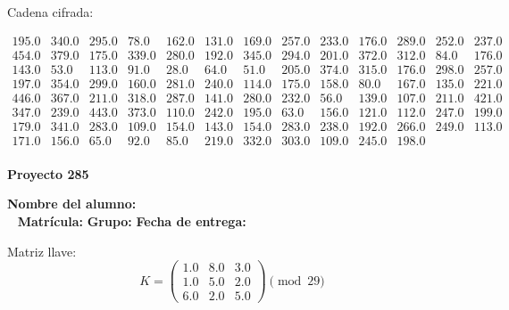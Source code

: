 \documentclass[12pt]{article}
\begin{document}
Cadena cifrada:
\begin{center}
$\begin{array}{lllllllllllll}
195.0 & 340.0 & 295.0 & 78.0 & 162.0 & 131.0 & 169.0 & 257.0 & 233.0 & 176.0 & 289.0 & 252.0 & 237.0\\
454.0 & 379.0 & 175.0 & 339.0 & 280.0 & 192.0 & 345.0 & 294.0 & 201.0 & 372.0 & 312.0 & 84.0 & 176.0\\
143.0 & 53.0 & 113.0 & 91.0 & 28.0 & 64.0 & 51.0 & 205.0 & 374.0 & 315.0 & 176.0 & 298.0 & 257.0\\
197.0 & 354.0 & 299.0 & 160.0 & 281.0 & 240.0 & 114.0 & 175.0 & 158.0 & 80.0 & 167.0 & 135.0 & 221.0\\
446.0 & 367.0 & 211.0 & 318.0 & 287.0 & 141.0 & 280.0 & 232.0 & 56.0 & 139.0 & 107.0 & 211.0 & 421.0\\
347.0 & 239.0 & 443.0 & 373.0 & 110.0 & 242.0 & 195.0 & 63.0 & 156.0 & 121.0 & 112.0 & 247.0 & 199.0\\
179.0 & 341.0 & 283.0 & 109.0 & 154.0 & 143.0 & 154.0 & 283.0 & 238.0 & 192.0 & 266.0 & 249.0 & 113.0\\
171.0 & 156.0 & 65.0 & 92.0 & 85.0 & 219.0 & 332.0 & 303.0 & 109.0 & 245.0 & 198.0\\
\end{array}$
\end{center}

\newpage


\textbf{Proyecto 285}

\textbf{Nombre del alumno:} \underline{\hspace{13cm}}\\\
\vspace{1cm}
\textbf{Matrícula:} \underline{\hspace{4cm}} \hspace{1cm}
\textbf{Grupo:} \underline{\hspace{2cm}}
\textbf{Fecha de entrega:} \underline{\hspace{2cm}}

\medskip

Matriz llave:
\[
K = \begin{pmatrix}
1.0 & 8.0 & 3.0\\
1.0 & 5.0 & 2.0\\
6.0 & 2.0 & 5.0
\end{pmatrix} \pmod{29}
\]
\end{document}
